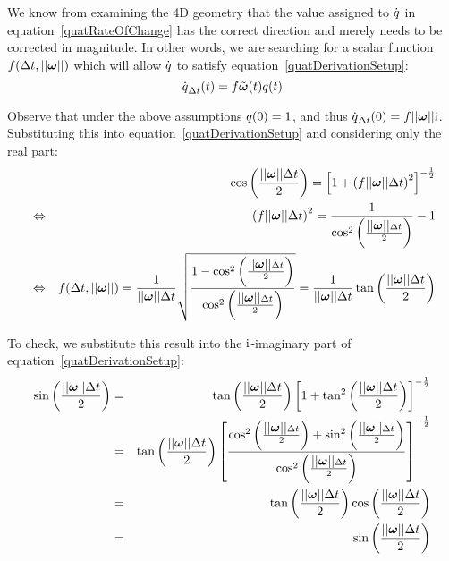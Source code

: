 We know from examining the 4D geometry that the value assigned to $\dot{\mbox{$q$}}$
in equation~\ref{quatRateOfChange} has the correct direction and merely needs to be
corrected in magnitude. In other words, we are searching for a scalar function
$f(\Delta t, \norm{\ve{\omega}})$ which will allow $\dot{\mbox{$q$}}$ to satisfy
equation~\ref{quatDerivationSetup}:
\begin{equation}
\dot{\q{q}}_{\Delta t}(t) = f\tilde{\ve{\omega}}(t)\q{q}(t)
\end{equation}

Observe that under the above assumptions $\mbox{$q$}(0) = 1$, and thus
$\dot{\q{q}}_{\Delta t}(0) = f \norm{\ve{\omega}} \qi$. Substituting this
into equation~\ref{quatDerivationSetup} and considering only the real part:
\begin{eqnarray*}
&& \cos\left(\frac{\norm{\ve{\omega}}\Delta t}{2}\right) =
    \left[1 + \left( f \norm{\ve{\omega}}\Delta t \right)^2 \right]^{-\frac{1}{2}} \\
&\Leftrightarrow&
    \left( f \norm{\ve{\omega}}\Delta t \right)^2 =
    \frac{1}{\cos^2\left(\frac{\norm{\ve{\omega}}\Delta t}{2}\right)} - 1 \\
&\Leftrightarrow&
    f(\Delta t, \norm{\ve{\omega}}) =
    \frac{1}{\norm{\ve{\omega}}\Delta t} \sqrt{\frac{
        1 - \cos^2\left(\frac{\norm{\ve{\omega}}\Delta t}{2}\right)}{
        \cos^2\left(\frac{\norm{\ve{\omega}}\Delta t}{2}\right)}} =
    \frac{1}{\norm{\ve{\omega}}\Delta t}
        \tan\left(\frac{\norm{\ve{\omega}}\Delta t}{2}\right)
\end{eqnarray*}

To check, we substitute this result into the $\mbox{$\mathrm{i}$}$-imaginary part of
equation~\ref{quatDerivationSetup}:
\begin{eqnarray*}
\sin\left(\frac{\norm{\ve{\omega}}\Delta t}{2}\right) & = &
    \tan\left(\frac{\norm{\ve{\omega}}\Delta t}{2}\right)
    \left[ 1 + \tan^2\left(\frac{\norm{\ve{\omega}}\Delta t}{2}\right)
    \right]^{-\frac{1}{2}} \\
&=& \tan\left(\frac{\norm{\ve{\omega}}\Delta t}{2}\right)
    \left[ \frac{\cos^2\left(\frac{\norm{\ve{\omega}}\Delta t}{2}\right) +
    \sin^2\left(\frac{\norm{\ve{\omega}}\Delta t}{2}\right) }{
    \cos^2\left(\frac{\norm{\ve{\omega}}\Delta t}{2}\right) }
    \right]^{-\frac{1}{2}} \\
&=& \tan\left(\frac{\norm{\ve{\omega}}\Delta t}{2}\right)
    \cos\left(\frac{\norm{\ve{\omega}}\Delta t}{2}\right) \\
&=& \sin\left(\frac{\norm{\ve{\omega}}\Delta t}{2}\right)
\end{eqnarray*}

